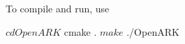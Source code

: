 To compile and run, use


\begin{DoxyCode}
$ cd OpenARK
$ cmake .
$ make
$ ./OpenARK
\end{DoxyCode}
 